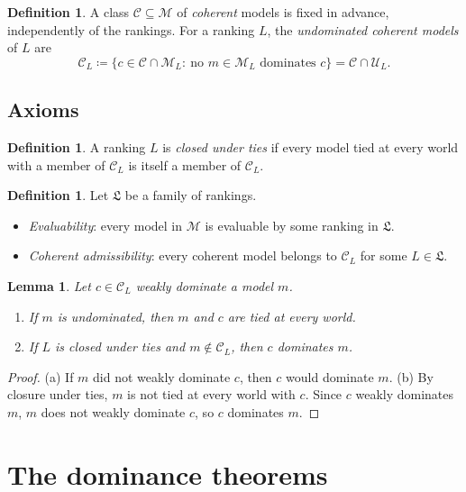 \documentclass[11pt]{article}
\newtheorem{lemma}[theorem]{Lemma}
\theoremstyle{definition}
\newtheorem{definition}[theorem]{Definition}
\newcommand{\M}{\mathcal M}
\newcommand{\C}{\mathcal C}
\newcommand{\U}{\mathcal U}
\newcommand{\Lf}{\mathfrak L}
\begin{document}
\begin{definition}\label{def:coherence-property}
A class $\C\subseteq\M$ of \emph{coherent} models is fixed in advance, independently of the rankings. For a ranking $L$, the \emph{undominated coherent models} of $L$ are
\[
\C_L\coloneqq\{c\in\C\cap\M_L:\ \text{no } m\in\M_L \text{ dominates } c\}=\C\cap\U_L.
\]
\end{definition}

\subsection{Axioms}

\begin{definition}\label{def:tie-closure}
A ranking $L$ is \emph{closed under ties} if every model tied at every world with a member of $\C_L$ is itself a member of $\C_L$.
\end{definition}

\begin{definition}\label{def:family-assumptions}
Let $\Lf$ be a family of rankings.
\begin{itemize}[leftmargin=*]
\item \emph{Evaluability}: every model in $\M$ is evaluable by some ranking in $\Lf$.
\item \emph{Coherent admissibility}: every coherent model belongs to $\C_L$ for some $L\in\Lf$.
\end{itemize}
\end{definition}

\begin{lemma}\label{lem:ties}
Let $c\in\C_L$ weakly dominate a model $m$.
\begin{enumerate}[label=(\alph*)]
\item If $m$ is undominated, then $m$ and $c$ are tied at every world.
\item If $L$ is closed under ties and $m\notin\C_L$, then $c$ dominates $m$.
\end{enumerate}
\end{lemma}
\begin{proof}
(a) If $m$ did not weakly dominate $c$, then $c$ would dominate $m$. (b) By closure under ties, $m$ is not tied at every world with $c$. Since $c$ weakly dominates $m$, $m$ does not weakly dominate $c$, so $c$ dominates $m$.
\end{proof}

\section{The dominance theorems}\label{sec:general}
\end{document}
